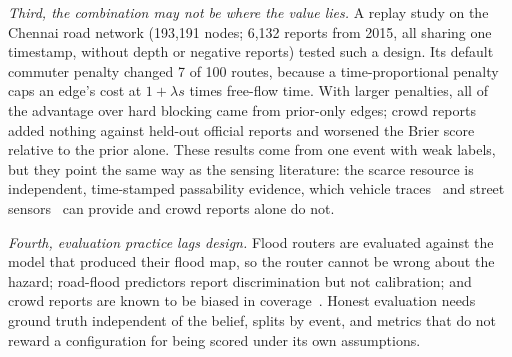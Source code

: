 \documentclass[journal]{IEEEtran}
\begin{document}
\emph{Third, the combination may not be where the value lies.} A replay study on the Chennai road network (193,191 nodes; 6,132 reports from 2015, all sharing one timestamp, without depth or negative reports) tested such a design. Its default commuter penalty changed 7 of 100 routes, because a time-proportional penalty caps an edge's cost at $1+\lambda s$ times free-flow time. With larger penalties, all of the advantage over hard blocking came from prior-only edges; crowd reports added nothing against held-out official reports and worsened the Brier score relative to the prior alone. These results come from one event with weak labels, but they point the same way as the sensing literature: the scarce resource is independent, time-stamped passability evidence, which vehicle traces~\cite{hiramoto2025probe,pietrobon2019closure,kong2022taxi} and street sensors~\cite{mydlarz2024floodnet} can provide and crowd reports alone do not.

\emph{Fourth, evaluation practice lags design.} Flood routers are evaluated against the model that produced their flood map, so the router cannot be wrong about the hazard; road-flood predictors report discrimination but not calibration; and crowd reports are known to be biased in coverage~\cite{esparza2023imbalance,liu2023wazecoverage}. Honest evaluation needs ground truth independent of the belief, splits by event, and metrics that do not reward a configuration for being scored under its own assumptions.
\end{document}
